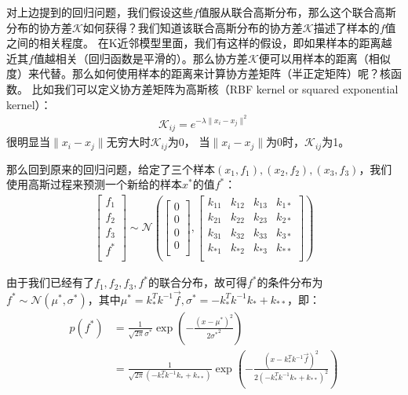 对上边提到的回归问题，我们假设这些$f$值服从联合高斯分布，那么这个联合高斯分布的协方差$\mathcal{K}$如何获得？我们知道该联合高斯分布的协方差$\mathcal{K}$描述了样本的$f$值之间的相关程度。 在K近邻模型里面，我们有这样的假设，即如果样本的距离越近其$f$值越相关（回归函数是平滑的）。那么协方差$\mathcal{K}$便可以用样本的距离（相似度）来代替。那么如何使用样本的距离来计算协方差矩阵（半正定矩阵）呢？核函数。
比如我们可以定义协方差矩阵为高斯核（RBF kernel or squared exponential kernel）：
\begin{displaymath}
\begin{split}
\mathcal{K}_{ij} = e^{-\lambda \| x_i-x_j \|^2}
\end{split}
\end{displaymath}
很明显当$\| x_i-x_j \|$无穷大时$\mathcal{K}_{ij}$为0， 当$\| x_i-x_j \|$为0时，$\mathcal{K}_{ij}$为1。

那么回到原来的回归问题，给定了三个样本$(x_1, f_1), (x_2, f_2), (x_3, f_3)$，我们使用高斯过程来预测一个新给的样本$x^*$的值$f^*$：
\begin{displaymath}
\begin{split}
\begin{bmatrix}
f_1\\
f_2\\
f_3\\
f^*\\
\end{bmatrix}
\sim \mathcal{N} \left(
\begin{bmatrix}
0\\
0\\
0\\
0\\
\end{bmatrix},
\begin{bmatrix}
k_{11} & k_{12} & k_{13} & k_{1*}\\
k_{21} & k_{22} & k_{23} & k_{2*}\\
k_{31} & k_{32} & k_{33} & k_{3*}\\
k_{*1} & k_{*2} & k_{*3} & k_{**}\\
\end{bmatrix}
\right)
\end{split}
\end{displaymath}

由于我们已经有了$f_1, f_2, f_3, f^*$的联合分布，故可得$f^*$的条件分布为$f^* \sim \mathcal{N}(\mu^*, \sigma^*)$，其中$\mu^* = k_*^T k^{-1} \vec{f}, \sigma^*= -k_*^Tk^{-1}k_* + k_{**}$，即：
\begin{displaymath}
\begin{split}
p(f^*) &= \frac{1}{\sqrt{2\pi}\sigma^*} \exp{\left ( - \frac{(x-\mu^*)^2}{2{\sigma^*}^2} \right)}\\
&= \frac{1}{\sqrt{2\pi} (-k_*^Tk^{-1}k_* + k_{**})} \exp{\left ( - \frac{(x-  k_*^T k^{-1} \vec{f})^2}{2{(-k_*^Tk^{-1}k_* + k_{**})}^2} \right)}\\
\end{split}
\end{displaymath}

